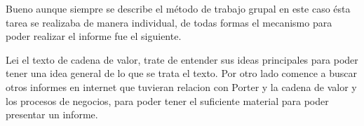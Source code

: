 Bueno aunque siempre se describe el método de trabajo grupal en este caso
ésta tarea se realizaba de manera individual, de todas formas el mecanismo
para poder realizar el informe fue el siguiente.

Lei el texto de cadena de valor, trate de entender sus ideas principales para
poder tener una idea general de lo que se trata el texto. Por otro lado comence
a buscar otros informes en internet que tuvieran relacion con Porter y la cadena
de valor y los procesos de negocios, para poder tener el suficiente material
para poder presentar un informe.



\newpage
